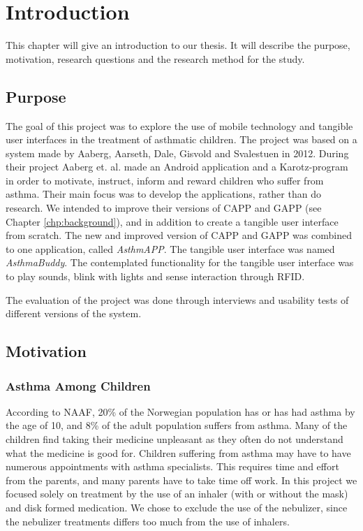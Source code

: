 \chapter{Introduction}
\label{chp:introduction}

This chapter will give an introduction to our thesis. It will describe the purpose, motivation, research questions and the research method for the study. 

\section{Purpose}
\label{sec:purpose}
The goal of this project was to explore the use of mobile technology and tangible user interfaces in the treatment of asthmatic children. The project was based on a system made by Aaberg, Aarseth, Dale, Gisvold and Svalestuen in 2012\cite{CustomerDriven}. During their project Aaberg et. al. made an Android application and a Karotz-program in order to motivate, instruct, inform and reward children who suffer from asthma. Their main focus was to develop the applications, rather than do research.
We intended to improve their versions of CAPP and GAPP (see Chapter \ref{chp:background}), and in addition to create a tangible user interface from scratch. The new and improved version of CAPP and GAPP was combined to one application, called \emph{AsthmAPP}. The tangible user interface was named \emph{AsthmaBuddy}. The contemplated functionality for the tangible user interface was to play sounds, blink with lights and sense interaction through RFID. 

The evaluation of the project was done through interviews and usability tests of different versions of the system. 
 

\section{Motivation}
\label{sec:motivation}
\subsection{Asthma Among Children}
According to NAAF, 20\% of the Norwegian population has or has had asthma by the age of 10, and 8\% of the adult population suffers from asthma\cite{NAAFStat}. Many of the children find taking their medicine unpleasant as they often do not understand what the medicine is good for. Children suffering from asthma may have to have numerous appointments with  asthma specialists. This requires time and effort from the parents, and many parents have to take time off work. In this project we focused solely on treatment by the use of an inhaler (with or without the mask) and disk formed medication. We chose to exclude the use of the nebulizer, since the nebulizer treatments differs too much from the use of inhalers.

